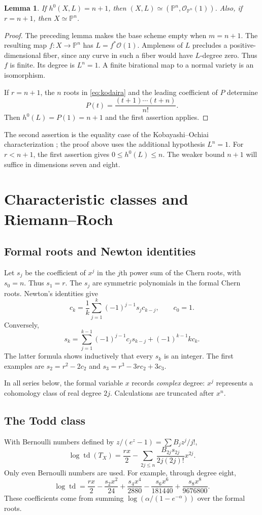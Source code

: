 \documentclass[11pt,reqno,letterpaper]{amsart}
\newcommand{\PP}{\mathbb P}
\newcommand{\td}{\operatorname{td}}
\newcommand{\OO}{\mathcal O}
\newtheorem{lemma}[theorem]{Lemma}
\theoremstyle{definition}
\numberwithin{equation}{section}
\begin{document}
\begin{lemma}\label{lem:equality}
If $h^0(X,L)=n+1$, then $(X,L)\simeq(\PP^n,\OO_{\PP^n}(1))$.
Also, if $r=n+1$, then $X\simeq\PP^n$.
\end{lemma}
\begin{proof}
The preceding lemma makes the base scheme empty when $m=n+1$.
The resulting map $f:X\to\PP^n$ has $L=f^*\OO(1)$. Ampleness of $L$
precludes a positive-dimensional fiber, since any curve in such a fiber
would have $L$-degree zero. Thus $f$ is finite. Its degree is $L^n=1$.
A finite birational map to a normal variety is an isomorphism.

If $r=n+1$, the $n$ roots in \eqref{eq:kodaira} and the leading coefficient
of $P$ determine
\[
 P(t)=\frac{(t+1)\cdots(t+n)}{n!}.
\]
Then $h^0(L)=P(1)=n+1$ and the first assertion applies.
\end{proof}
The second assertion is the equality case of the Kobayashi--Ochiai
characterization \cite{ko}; the proof above uses the additional hypothesis
$L^n=1$. For $r<n+1$, the first assertion gives $0\le h^0(L)\le n$.
The weaker bound $n+1$ will suffice in dimensions seven and eight.

\section{Characteristic classes and Riemann--Roch}\label{sec:formal}

\subsection{Formal roots and Newton identities}
Let $s_j$ be the coefficient of $x^j$ in the $j$th power sum of the
Chern roots, with $s_0=n$. Thus $s_1=r$. The $s_j$ are symmetric polynomials in the formal Chern roots.
Newton's identities give
\begin{equation}\label{eq:newton}
 c_k=\frac1k\sum_{j=1}^k(-1)^{j-1}s_jc_{k-j},\qquad c_0=1.
\end{equation}
Conversely,
\[
 s_k=\sum_{j=1}^{k-1}(-1)^{j-1}c_js_{k-j}
       +(-1)^{k-1}kc_k.
\]
The latter formula shows inductively that every $s_k$ is an integer.
The first examples are
$s_2=r^2-2c_2$ and $s_3=r^3-3rc_2+3c_3$.

In all series below, the formal variable $x$ records \emph{complex} degree:
$x^j$ represents a cohomology class of real degree $2j$.
Calculations are truncated after $x^n$.

\subsection{The Todd class}
With Bernoulli numbers defined by $z/(e^z-1)=\sum B_jz^j/j!$,
\begin{equation}\label{eq:logTodd}
 \log\td(T_X)=\frac{rx}{2}
 -\sum_{2j\le n}\frac{B_{2j}s_{2j}}{2j(2j)!}x^{2j}.
\end{equation}
Only even Bernoulli numbers are used. For example, through degree eight,
\[
 \log\td=\frac{rx}{2}-\frac{s_2x^2}{24}
 +\frac{s_4x^4}{2880}-\frac{s_6x^6}{181440}
 +\frac{s_8x^8}{9676800}.
\]
These coefficients come from summing
$\log(\alpha/(1-e^{-\alpha}))$ over the formal roots.
\end{document}
